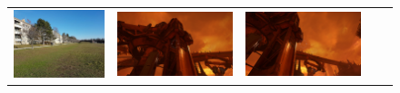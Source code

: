 \begin{figure}[h]
\begin{tabular}{ccccc}
	\includegraphics[width=\mywidth]{figures/seriesC_1.jpg} &
	\includegraphics[width=\mywidth]{figures/doom1.jpg} &
	\includegraphics[width=\mywidth]{figures/doom2.jpg} &

\end{tabular}
\end{figure}
